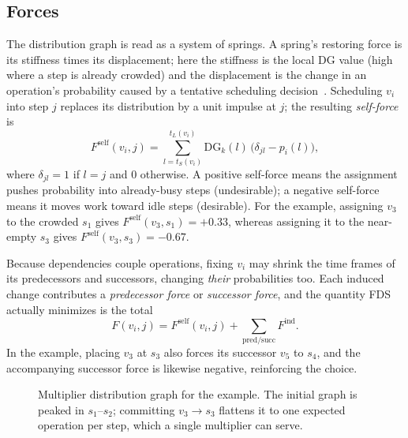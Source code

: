 \documentclass[conference]{IEEEtran}
\begin{document}
\subsection{Forces}
The distribution graph is read as a system of springs. A spring's restoring
force is its stiffness times its displacement; here the stiffness is the local
DG value (high where a step is already crowded) and the displacement is the
change in an operation's probability caused by a tentative scheduling
decision~\cite{b1}. Scheduling $v_i$ into step $j$ replaces its distribution by
a unit impulse at $j$; the resulting \emph{self-force} is
\begin{equation}
F^{\mathrm{self}}(v_i,j)=\sum_{l=t_S(v_i)}^{t_L(v_i)}
   \mathrm{DG}_k(l)\,\bigl(\delta_{jl}-p_i(l)\bigr),
\label{eq:self}
\end{equation}
where $\delta_{jl}=1$ if $l=j$ and $0$ otherwise. A positive self-force means
the assignment pushes probability into already-busy steps (undesirable); a
negative self-force means it moves work toward idle steps (desirable). For the
example, assigning $v_3$ to the crowded $s_1$ gives
$F^{\mathrm{self}}(v_3,s_1)=+0.33$, whereas assigning it to the near-empty $s_3$
gives $F^{\mathrm{self}}(v_3,s_3)=-0.67$.

Because dependencies couple operations, fixing $v_i$ may shrink the time frames
of its predecessors and successors, changing \emph{their} probabilities too.
Each induced change contributes a \emph{predecessor force} or
\emph{successor force}, and the quantity FDS actually minimizes is the total
\begin{equation}
F(v_i,j)=F^{\mathrm{self}}(v_i,j)+\!\!\sum_{\text{pred/succ}}\!\!
   F^{\mathrm{ind}}.
\label{eq:total}
\end{equation}
In the example, placing $v_3$ at $s_3$ also forces its successor $v_5$ to $s_4$,
and the accompanying successor force is likewise negative, reinforcing the
choice.

\begin{figure}[t]
\centering
{}
\caption{Multiplier distribution graph for the example. The initial graph is
peaked in $s_1$--$s_2$; committing $v_3\!\to\!s_3$ flattens it to one expected
operation per step, which a single multiplier can serve.}
\label{fig:dg}
\end{figure}
\end{document}
